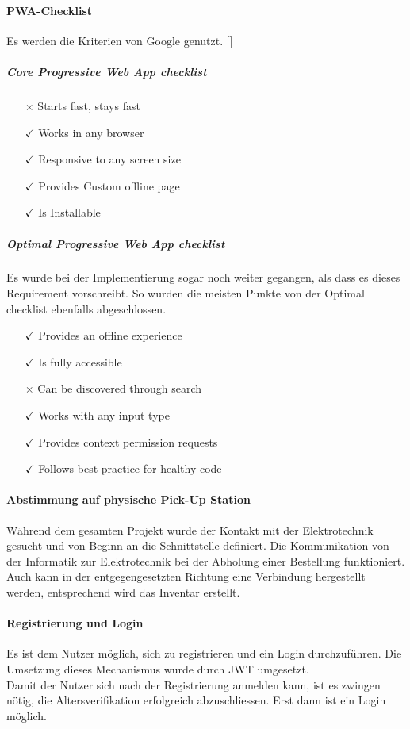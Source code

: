 \paragraph{PWA-Checklist}
Es werden die Kriterien von Google genutzt. [\cite{pwaChecklist}]
\subparagraph{Core Progressive Web App checklist}
\begin{itemize}
	\item [{$\times$}] Starts fast, stays fast
	\item [{$\checkmark$}] Works in any browser
	\item [{$\checkmark$}] Responsive to any screen size
	\item [{$\checkmark$}] Provides Custom offline page
	\item [{$\checkmark$}] Is Installable
\end{itemize}
\subparagraph{Optimal Progressive Web App checklist}
Es wurde bei der Implementierung sogar noch weiter gegangen, als dass es dieses Requirement vorschreibt. So wurden die meisten Punkte von der Optimal checklist ebenfalls abgeschlossen. 
\begin{itemize}
	\item [{$\checkmark$}] Provides an offline experience
	\item [{$\checkmark$}] Is fully accessible
	\item [{$\times$}] Can be discovered through search
	\item [{$\checkmark$}] Works with any input type
	\item [{$\checkmark$}] Provides context permission requests
	\item [{$\checkmark$}] Follows best practice for healthy code
\end{itemize}

\paragraph{Abstimmung auf physische Pick-Up Station}
Während dem gesamten Projekt wurde der Kontakt mit der Elektrotechnik gesucht und von Beginn an die Schnittstelle definiert. Die Kommunikation von der Informatik zur Elektrotechnik bei der Abholung einer Bestellung funktioniert. Auch kann in der entgegengesetzten Richtung eine Verbindung hergestellt werden, entsprechend wird das Inventar erstellt. 

\paragraph{Registrierung und Login}
Es ist dem Nutzer möglich, sich zu registrieren und ein Login durchzuführen. Die Umsetzung dieses Mechanismus wurde durch \ac{JWT} umgesetzt. \\
Damit der Nutzer sich nach der Registrierung anmelden kann, ist es zwingen nötig, die Altersverifikation erfolgreich abzuschliessen. Erst dann ist ein Login möglich. \\

